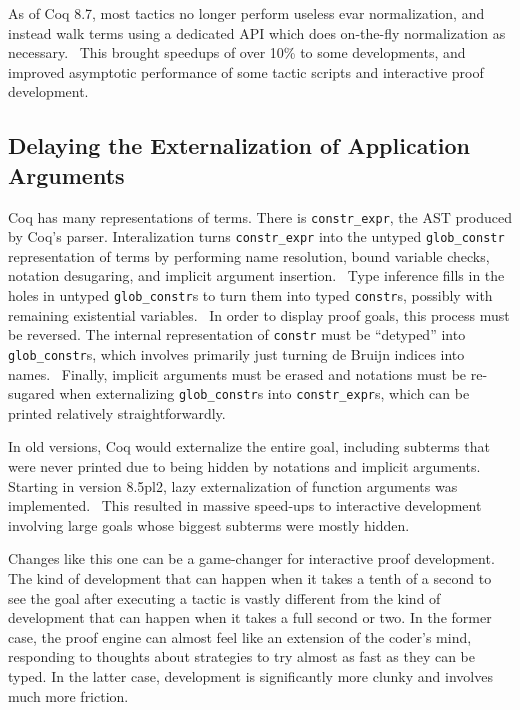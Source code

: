 As of Coq 8.7, most tactics no longer perform useless evar normalization, and instead walk terms using a dedicated API which does on-the-fly normalization as necessary.~\cite{coq-pr-econstr}
This brought speedups of over 10\% to some developments, and improved asymptotic performance of some tactic scripts and interactive proof development.

\subsection{Delaying the Externalization of Application Arguments}\label{sec:delayed-externalization}
Coq has many representations of terms.
There is \texttt{constr\_expr}, the AST produced by Coq's parser.
Interalization turns \texttt{constr\_expr} into the untyped \texttt{glob\_constr} representation of terms by performing name resolution, bound variable checks, notation desugaring, and implicit argument insertion.~\cite{Constrintern}
Type inference fills in the holes in untyped \texttt{glob\_constr}s to turn them into typed \texttt{constr}s, possibly with remaining existential variables.~\cite{Pretyping}
In order to display proof goals, this process must be reversed.
The internal representation of \texttt{constr} must be ``detyped'' into \texttt{glob\_constr}s, which involves primarily just turning de Bruijn indices into names.~\cite{Detyping}
Finally, implicit arguments must be erased and notations must be re-sugared when externalizing \texttt{glob\_constr}s into \texttt{constr\_expr}s, which can be printed relatively straightforwardly.~\cite{Constrextern,Ppconstr}

In old versions, Coq would externalize the entire goal, including subterms that were never printed due to being hidden by notations and implicit arguments.
Starting in version 8.5pl2, lazy externalization of function arguments was implemented.~\cite{coq-commit-delayed-externalization}
This resulted in massive speed-ups to interactive development involving large goals whose biggest subterms were mostly hidden.

Changes like this one can be a game-changer for interactive proof development.
The kind of development that can happen when it takes a tenth of a second to see the goal after executing a tactic is vastly different from the kind of development that can happen when it takes a full second or two.
In the former case, the proof engine can almost feel like an extension of the coder's mind, responding to thoughts about strategies to try almost as fast as they can be typed.
In the latter case, development is significantly more clunky and involves much more friction.

